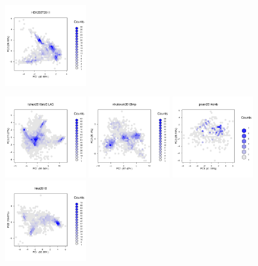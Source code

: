 \documentclass[12pt]{article}\usepackage[]{graphicx}\usepackage[]{color}
\begin{document}
\begin{appendices}
\begin{figure}[htb]
  \includegraphics[width = 0.32\textwidth]{./figure/fighexpca-21.pdf}
\end{figure}
\begin{figure}[htb]\ContinuedFloat
  \includegraphics[width = 0.32\textwidth]{./figure/fighexpca-22.pdf}
  \includegraphics[width = 0.32\textwidth]{./figure/fighexpca-23.pdf}
  \includegraphics[width = 0.32\textwidth]{./figure/fighexpca-24.pdf}
  \includegraphics[width = 0.32\textwidth]{./figure/fighexpca-25.pdf}

\end{figure}
\end{appendices}
\end{document}
